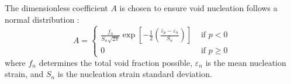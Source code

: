 \documentclass[sn-mathphys,Numbered]{sn-jnl}%
\newcommand{\bb}{\boldsymbol}
\begin{document}
The dimensionless coefficient $A$ is chosen to ensure void nucleation follows a normal distribution \cite{chu_void_1980}:
\begin{equation} \label{eqn:nucleatonA}
	A =
	\begin{cases}
	\frac{f_n}{S_n \sqrt{2 \pi}} \exp \left[-\frac{1}{2}\left(\frac{\bar{\varepsilon}_p-\varepsilon_n}{S_n}\right)\right] & \text { if } p < 0 \\
	0 & \text { if } p \geq 0
	\end{cases}
\end{equation}
where $f_n$ determines the total void fraction possible, $\varepsilon_n$ is the mean nucleation strain, and $S_n$ is the nucleation strain standard deviation. 



%
\end{document}
